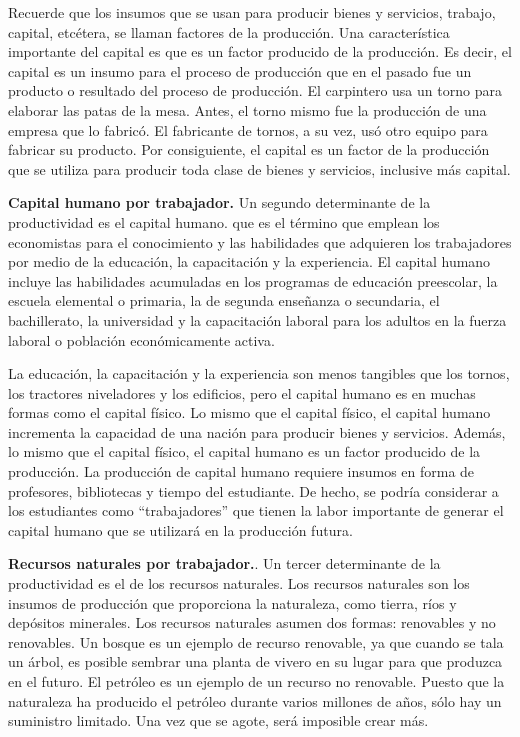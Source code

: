 \documentclass[
]{krantz}
\begin{document}
Recuerde que los insumos que se usan para producir bienes y servicios, trabajo, capital, etcétera, se llaman factores de la producción. Una característica importante del capital es que es un factor producido de la producción. Es decir, el capital es un insumo para el proceso de producción que en el pasado fue un producto o resultado del proceso de producción. El carpintero usa un torno para elaborar las patas de la mesa. Antes, el torno mismo fue la producción de una empresa que lo fabricó. El fabricante de tornos, a su vez, usó otro equipo para fabricar su producto. Por consiguiente, el capital es un factor de la producción que se utiliza para producir toda clase de bienes y servicios, inclusive más capital.

\textbf{Capital humano por trabajador.} Un segundo determinante de la productividad es el capital humano. que es el término que emplean los economistas para el conocimiento y las habilidades que adquieren los trabajadores por medio de la educación, la capacitación y la experiencia. El capital humano incluye las habilidades acumuladas en los programas de educación preescolar, la escuela elemental o primaria, la de segunda enseñanza o secundaria, el bachillerato, la universidad y la capacitación laboral para los adultos en la fuerza laboral o población económicamente activa.

La educación, la capacitación y la experiencia son menos tangibles que los tornos, los tractores niveladores y los edificios, pero el capital humano es en muchas formas como el capital físico. Lo mismo que el capital físico, el capital humano incrementa la capacidad de una nación para producir bienes y servicios. Además, lo mismo que el capital físico, el capital humano es un factor producido de la producción. La producción de capital humano requiere insumos en forma de profesores, bibliotecas y tiempo del estudiante. De hecho, se podría considerar a los estudiantes como ``trabajadores'' que tienen la labor importante de generar el capital humano que se utilizará en la producción futura.

\textbf{Recursos naturales por trabajador.}. Un tercer determinante de la productividad es el de los recursos naturales. Los recursos naturales son los insumos de producción que proporciona la naturaleza, como tierra, ríos y depósitos minerales. Los recursos naturales asumen dos formas: renovables y no renovables. Un bosque es un ejemplo de recurso renovable, ya que cuando se tala un árbol, es posible sembrar una planta de vivero en su lugar para que produzca en el futuro. El petróleo es un ejemplo de un recurso no renovable. Puesto que la naturaleza ha producido el petróleo durante varios millones de años, sólo hay un suministro limitado. Una vez que se agote, será imposible crear más.
\end{document}
